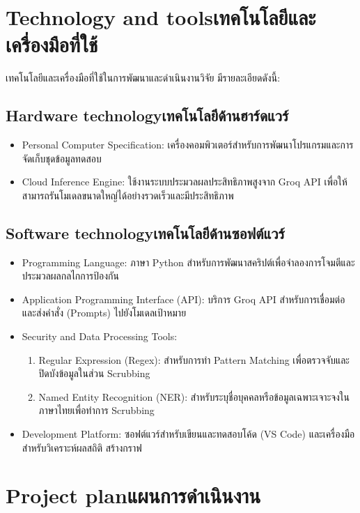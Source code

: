 \section{\ifenglish Technology and tools\else เทคโนโลยีและเครื่องมือที่ใช้\fi}
เทคโนโลยีและเครื่องมือที่ใช้ในการพัฒนาและดำเนินงานวิจัย มีรายละเอียดดังนี้:
\subsection{\ifenglish Hardware technology\else เทคโนโลยีด้านฮาร์ดแวร์\fi}
\begin{itemize}
    \item Personal Computer Specification: เครื่องคอมพิวเตอร์สำหรับการพัฒนาโปรแกรมและการจัดเก็บชุดข้อมูลทดสอบ
    \item Cloud Inference Engine: ใช้งานระบบประมวลผลประสิทธิภาพสูงจาก Groq API เพื่อให้สามารถรันโมเดลขนาดใหญ่ได้อย่างรวดเร็วและมีประสิทธิภาพ
\end{itemize}
\subsection{\ifenglish Software technology\else เทคโนโลยีด้านซอฟต์แวร์\fi}
\begin{itemize}
    \item Programming Language: ภาษา Python สำหรับการพัฒนาสคริปต์เพื่อจำลองการโจมตีและประมวลผลกลไกการป้องกัน
    \item Application Programming Interface (API): บริการ Groq API สำหรับการเชื่อมต่อและส่งคำสั่ง (Prompts) ไปยังโมเดลเป้าหมาย
    \item Security and Data Processing Tools:
        \begin{enumerate}
            \item Regular Expression (Regex): สำหรับการทำ Pattern Matching เพื่อตรวจจับและปิดบังข้อมูลในส่วน Scrubbing
            \item Named Entity Recognition (NER): สำหรับระบุชื่อบุคคลหรือข้อมูลเฉพาะเจาะจงในภาษาไทยเพื่อทำการ Scrubbing
        \end{enumerate}
    \item Development Platform: ซอฟต์แวร์สำหรับเขียนและทดสอบโค้ด (VS Code) และเครื่องมือสำหรับวิเคราะห์ผลสถิติ สร้างกราฟ
\end{itemize}
\section{\ifenglish Project plan\else แผนการดำเนินงาน\fi}

